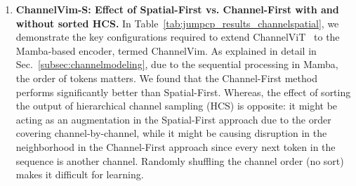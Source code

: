 \begin{enumerate}


\item  \textbf{ChannelVim-S: Effect of Spatial-First vs. Channel-First with and without sorted HCS.} In Table~\ref{tab:jumpcp_results_channelspatial}, we demonstrate the key configurations required to extend ChannelViT~\cite{channelvit} to the Mamba-based encoder, termed ChannelVim. As explained in detail in Sec.~\ref{subsec:channelmodeling}, due to the sequential processing in Mamba, the order of tokens matters. We found that the Channel-First method performs significantly better than Spatial-First. Whereas, the effect of sorting the output of hierarchical channel sampling (HCS) is opposite: it might be acting as an augmentation in the Spatial-First approach due to the order covering channel-by-channel, while it might be causing disruption in the neighborhood in the Channel-First approach since every next token in the sequence is another channel. Randomly shuffling the channel order (no sort) makes it difficult for learning.
\\

\begin{table}[!h]
    \caption{ChannelVim-S: Effect of Spatial-First vs. Channel-First with and without sorted HCS on 160-way perturbed gene prediction on JUMP-CP dataset. All methods use hierarchical channel sampling~\cite{channelvit} for training, and testing is done using all 8 channels. Each cell image is of resolution $224 \times 224 \times 8$.}
    \begin{center}
\end{center}
    \label{tab:jumpcp_results_channelspatial}
\end{table}



\end{enumerate}
